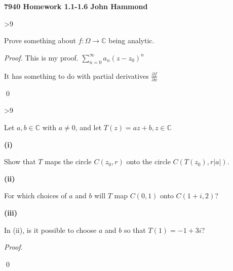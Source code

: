 \documentclass[11pt]{article}
\def\C{{\mathbb{C}}}
\def\ds {\displaystyle}
\newcommand{\pd}[2]{\frac{\partial #1}{\partial #2}}
\newcommand{\powerseries}{\sum_{n=0}^\infty a_n (z-z_0)^n}
\newenvironment{problem}[1]%
  {\vspace{\baselineskip}%
   \ifnum #1>9 \else \hspace{.78ex} \fi {\large \bf#1.$\;$}%
   \begin{lrbox}{\probinput}%
   \begin{minipage}[t]{.9175\textwidth}}%
  {\end{minipage}%
   \end{lrbox}%
   \usebox{\probinput}}
\newenvironment{subprob}[1]%
  {\vspace{.5\baselineskip}%
   {\bf #1)$\;$}%
   \begin{lrbox}{\subinput}%
   \begin{minipage}[t]{.965\textwidth}}%
  {\end{minipage}%
   \end{lrbox}%
   \usebox{\subinput}}
\begin{document}
{\large \bf 7940 Homework 1.1-1.6 \hfill John Hammond}
\vspace{\baselineskip}

\begin{problem}{1} 
Prove something about $f : \Omega \to \C$ being analytic.

\emph{Proof.}  This is my proof.   $\ds \powerseries$

It has something to do with partial derivatives $\pd{f}{x}$

\qed
\end {problem}

\begin{problem}{15}
Let $a, b \in \C$ with $a \not=0$, and let $T(z) = az + b, z \in \C$

\begin{subprob}{(i}
Show that $T$ maps the circle $C(z_0, r) $ onto the circle $C(T(z_0), r|a|)$.
\end{subprob}
\begin{subprob}{(ii}
For which choices of $a$ and $b$ will $T$ map $C(0,1)$ onto $C(1 + i, 2)$?
\end{subprob}
\begin{subprob}{(iii}
In (ii), is it possible to choose $a$ and $b$ so that $T(1) = -1 + 3i$?
\end{subprob}
\emph{Proof.}

\qed
\end{problem}
\end{document}
